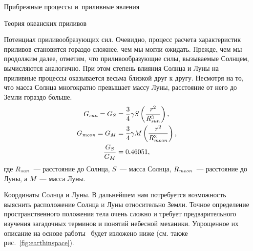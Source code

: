 \begin{chapter}{Прибрежные процессы и~приливные явления}
\begin{section}{Теория океанских приливов}
\begin{paragraph}{Потенциал приливообразующих сил.}
Очевидно, процесс расчета характеристик приливов становится гораздо
сложнее, чем мы могли ожидать. Прежде, чем мы продолжим далее, отметим, что
приливообразующие силы, вызываемые Солнцем, вычисляются аналогично.
При этом степень влияния Солнца и Луны на приливные процессы оказывается
весьма близкой друг к другу. Несмотря на то, что масса Солнца многократно 
превышает массу Луны, расстояние от него до Земли гораздо больше.
\begin{align}
 G_{\text{\textit{sun}}}     = G_{S} &= \frac{3}{4} \gamma S \left( \frac{r^{2}}{R_{\text{\textit{sun}}}^{3}} \right), \\
 G_{\text{\textit{moon}}}    = G_{M} &= \frac{3}{4} \gamma M \left( \frac{r^{2}}{R_{\text{\textit{moon}}}^{3}} \right), \\
\frac{G_{S}}{G_{M}} &= 0.46051,
\end{align}
где $R_{\text{\textit{sun}}}$~--- расстояние до Солнца, $S$~--- масса Солнца,
$R_{\text{\textit{moon}}}$~--- расстояние до Луны, а $M$~--- масса Луны.
%
\end{paragraph}

\begin{paragraph}{Координаты Солнца и Луны.}
В дальнейшем нам потребуется
возможность выяснить расположение Солнца и Луны относительно Земли.
Точное определение пространственного положения тела очень сложно и
требует предварительного изучения загадочных терминов и понятий небесной
механики. Упрощенное их описание на основе работы~\cite{Pugh:1987} будет
изложено ниже (см. также рис.~\ref{fig:earthinspace}).
%


\end{paragraph}
\end{section}
\end{chapter}

